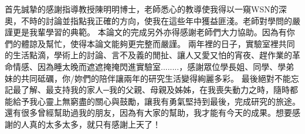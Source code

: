 
	首先誠摯的感謝指導教授陳明明博士，老師悉心的教導使我得以一窺WSN的深奧，不時的討論並指點我正確的方向，使我在這些年中獲益匪淺。老師對學問的嚴謹更是我輩學習的典範。
    本論文的完成另外亦得感謝老師們大力協助。因為有你們的體諒及幫忙，使得本論文能夠更完整而嚴謹。
 兩年裡的日子，實驗室裡共同的生活點滴，學術上的討論、言不及義的閒扯、讓人又愛又怕的宵夜、趕作業的革命情感、因為睡太晚而遮遮掩掩閃進實驗室........，感謝眾位學長姐、同學、學弟妹的共同砥礪，你/妳們的陪伴讓兩年的研究生活變得絢麗多彩。
	最後絕對不能忘記最了解、最支持我的家人─我的父親、母親及姊姊，在我喪失動力之時，隨時都能給予我心靈上無窮盡的關心與鼓勵，讓我有勇氣堅持到最後，完成研究的旅途。還有很多曾經幫助過我的朋友，因為有大家的幫助，我才能有今天的成果。想要感謝的人真的太多太多，就只有感謝上天了！

